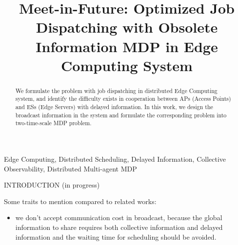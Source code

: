 \documentclass[10pt, conference, letterpaper]{IEEEtran}
\begin{document}
    \title{
        Meet-in-Future: Optimized Job Dispatching with Obsolete Information MDP in Edge Computing System
    }
    \author{
    }
    \maketitle

    \begin{abstract}
        \label{sec:abstract}
        We formulate the problem with job dispatching in distributed Edge Computing system, and identify the difficulty exists in cooperation between APs (Access Points) and ESs (Edge Servers) with delayed information. In this work, we design the broadcast information in the system and formulate the corresponding problem into two-time-scale MDP problem.
    \end{abstract}

    \begin{IEEEkeywords}
        Edge Computing, Distributed Scheduling, Delayed Information, Collective Observability, Distributed Multi-agent MDP
    \end{IEEEkeywords}

    \begin{section}{INTRODUCTION}
        \label{sec:introduction}
        (in progress)

        Some traits to mention compared to related works:
        \begin{itemize}
            \item we don't accept communication cost in broadcast, because the global information to share requires both collective information and delayed information and the waiting time for scheduling should be avoided.
        \end{itemize}
    \end{section}
\end{document}
